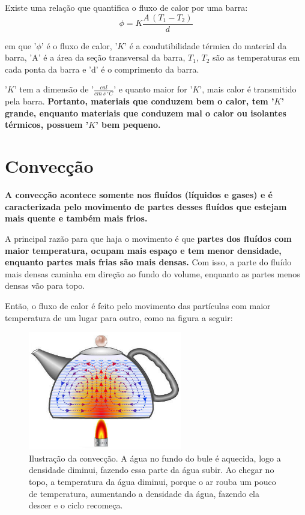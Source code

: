 \documentclass[12pt]{extarticle}
\newcommand{\<}{\langle}
\renewcommand{\>}{\rangle}
\theoremstyle{definition}
\begin{document}
Existe uma relação que quantifica o fluxo de calor por uma barra:
\begin{equation}
    \phi = K\frac{A\,(T_1 - T_2)}{d}
\end{equation}

\noindent em que '$\phi$' é o fluxo de calor, '$K$' é a condutibilidade térmica do material da barra, 'A' é a área da seção transversal da barra, $T_1,\,T_2$ são as temperaturas em cada ponta da barra e 'd' é o comprimento da barra.

'$K$' tem a dimensão de '$\frac{cal}{cm\,s\,^\circ C}$' e quanto maior for '$K$', mais calor é transmitido pela barra. \textbf{Portanto, materiais que conduzem bem o calor, tem '$K$' grande, enquanto materiais que conduzem mal o calor ou isolantes térmicos, possuem '$K$' bem pequeno.}

\section{Convecção}
\textbf{A convecção acontece somente nos fluídos (líquidos e gases) e é caracterizada pelo movimento de partes desses fluídos que estejam mais quente e também mais frios.}

A principal razão para que haja o movimento é que \textbf{partes dos fluídos com maior temperatura, ocupam mais espaço e tem menor densidade, enquanto partes mais frias são mais densas.}
Com isso, a parte do fluído mais densas caminha em direção ao fundo do volume, enquanto as partes menos densas vão para topo. 

Então, o fluxo de calor é feito pelo movimento das partículas com maior temperatura de um lugar para outro, como na figura a seguir:
\begin{figure}[h]
    \centering
    \includegraphics[width=0.6\textwidth]{conveccao-no-bule-5c2e5b51c413a.jpg}
    \caption{Ilustração da convecção. A água no fundo do bule é aquecida, logo a densidade diminui, fazendo essa parte da água subir. Ao chegar no topo, a temperatura da água diminui, porque o ar rouba um pouco de temperatura, aumentando a densidade da água, fazendo ela descer e o ciclo recomeça.}
    \label{fig:convecção}
\end{figure}
\end{document}
